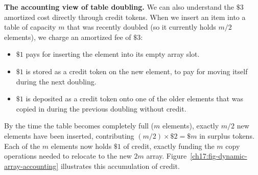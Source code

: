 \begin{intuitionbox}
\textbf{The accounting view of table doubling.}
We can also understand the $\$3$ amortized cost directly through credit tokens. When we insert an item into a table of capacity $m$ that was recently doubled (so it currently holds $m/2$ elements), we charge an amortized fee of $\$3$:
\begin{itemize}
  \item $\$1$ pays for inserting the element into its empty array slot.
  \item $\$1$ is stored as a credit token on the new element, to pay for moving itself during the next doubling.
  \item $\$1$ is deposited as a credit token onto one of the older elements that was copied in during the previous doubling without credit.
\end{itemize}
By the time the table becomes completely full ($m$ elements), exactly $m/2$ new elements have been inserted, contributing $(m/2) \times \$2 = \$m$ in surplus tokens. Each of the $m$ elements now holds $\$1$ of credit, exactly funding the $m$ copy operations needed to relocate to the new $2m$ array. Figure~\ref{ch17:fig-dynamic-array-accounting} illustrates this accumulation of credit.
\end{intuitionbox}

